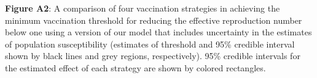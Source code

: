 \textbf{Figure A2}: A comparison of four vaccination strategies in achieving the minimum vaccination threshold for reducing the effective reproduction number below one using a version of our model that includes uncertainty in the estimates of population susceptibility (estimates of threshold and 95\% credible interval shown by black lines and grey regions, respectively). 95\% credible intervals for the estimated effect of each strategy are shown by colored rectangles.